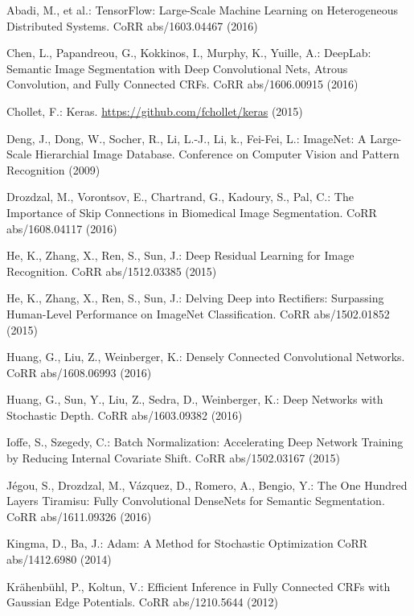 \documentclass{llncs}
\begin{document}
\begin{thebibliography}{25}

Abadi, M., et al.:
TensorFlow: Large-Scale Machine Learning on Heterogeneous Distributed Systems.
CoRR abs/1603.04467 (2016)

Chen, L., Papandreou, G., Kokkinos, I., Murphy, K., Yuille, A.:
DeepLab: Semantic Image Segmentation with Deep Convolutional Nets, Atrous Convolution, and Fully Connected CRFs.
CoRR abs/1606.00915 (2016)

Chollet, F.:
Keras.
\url{https://github.com/fchollet/keras} (2015)

Deng, J., Dong, W., Socher, R., Li, L.-J., Li, k., Fei-Fei, L.:
ImageNet: A Large-Scale Hierarchial Image Database.
Conference on Computer Vision and Pattern Recognition (2009)

Drozdzal, M., Vorontsov, E., Chartrand, G., Kadoury, S., Pal, C.:
The Importance of Skip Connections in Biomedical Image Segmentation.
CoRR abs/1608.04117 (2016)

He, K., Zhang, X., Ren, S., Sun, J.:
Deep Residual Learning for Image Recognition.
CoRR abs/1512.03385 (2015)

He, K., Zhang, X., Ren, S., Sun, J.:
Delving Deep into Rectifiers: Surpassing Human-Level Performance on ImageNet Classification.
CoRR abs/1502.01852 (2015)

Huang, G., Liu, Z., Weinberger, K.:
Densely Connected Convolutional Networks.
CoRR abs/1608.06993 (2016)

Huang, G., Sun, Y., Liu, Z., Sedra, D., Weinberger, K.:
Deep Networks with Stochastic Depth.
CoRR abs/1603.09382 (2016)

Ioffe, S., Szegedy, C.:
Batch Normalization: Accelerating Deep Network Training by Reducing Internal Covariate Shift.
CoRR abs/1502.03167 (2015)

J{\'{e}}gou, S., Drozdzal, M., V{\'{a}}zquez, D., Romero, A., Bengio, Y.:
The One Hundred Layers Tiramisu: Fully Convolutional DenseNets for Semantic Segmentation.
CoRR abs/1611.09326 (2016)

Kingma, D., Ba, J.:
Adam: {A} Method for Stochastic Optimization
CoRR abs/1412.6980 (2014)

Kr{\"{a}}henb{\"{u}}hl, P., Koltun, V.:
Efficient Inference in Fully Connected CRFs with Gaussian Edge Potentials.
CoRR abs/1210.5644 (2012)


\end{thebibliography}
\end{document}
